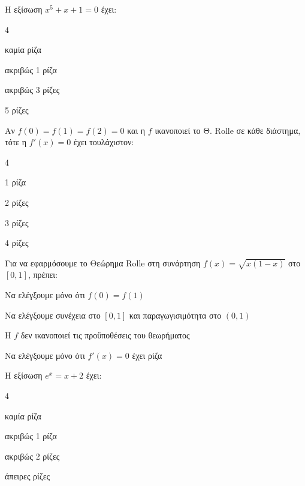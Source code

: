 \documentclass[11pt,a4paper,modern]{FFExercises}
\begin{document}
\askhsh
Η εξίσωση $x^5 + x + 1 = 0$ έχει:
\begin{multicols}{4}
\begin{alist}
  \item καμία ρίζα
  \item ακριβώς 1 ρίζα
  \item ακριβώς 3 ρίζες
  \item 5 ρίζες
\end{alist}
\end{multicols}

\askhsh
Αν $f(0) = f(1) = f(2) = 0$ και η $f$ ικανοποιεί το Θ. Rolle σε κάθε διάστημα, τότε η $f'(x) = 0$ έχει τουλάχιστον:
\begin{multicols}{4}
\begin{alist}
  \item 1 ρίζα
  \item 2 ρίζες
  \item 3 ρίζες
  \item 4 ρίζες
\end{alist}
\end{multicols}

\askhsh
Για να εφαρμόσουμε το Θεώρημα Rolle στη συνάρτηση $f(x) = \sqrt{x(1-x)}$ στο $[0, 1]$, πρέπει:
\begin{alist}
  \item Να ελέγξουμε μόνο ότι $f(0) = f(1)$
  \item Να ελέγξουμε συνέχεια στο $[0, 1]$ και παραγωγισιμότητα στο $(0, 1)$
  \item Η $f$ δεν ικανοποιεί τις προϋποθέσεις του θεωρήματος
  \item Να ελέγξουμε μόνο ότι $f'(x) = 0$ έχει ρίζα
\end{alist}

\askhsh
Η εξίσωση $e^x = x + 2$ έχει:
\begin{multicols}{4}
\begin{alist}
  \item καμία ρίζα
  \item ακριβώς 1 ρίζα
  \item ακριβώς 2 ρίζες
  \item άπειρες ρίζες
\end{alist}
\end{multicols}
\end{document}
